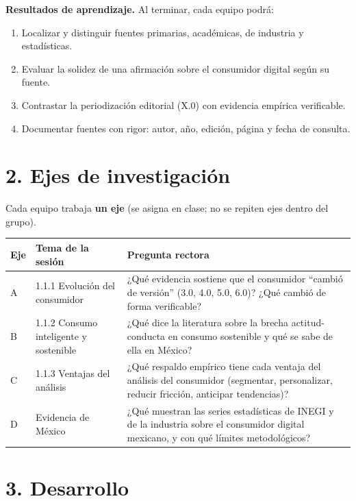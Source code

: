 \documentclass[11pt,letterpaper]{article}
\begin{document}
\begin{caja}
\textbf{Resultados de aprendizaje.} Al terminar, cada equipo podrá:
\begin{enumerate}[leftmargin=1.4em, itemsep=2pt]
  \item Localizar y distinguir fuentes primarias, académicas, de industria y estadísticas.
  \item Evaluar la solidez de una afirmación sobre el consumidor digital según su fuente.
  \item Contrastar la periodización editorial (X.0) con evidencia empírica verificable.
  \item Documentar fuentes con rigor: autor, año, edición, página y fecha de consulta.
\end{enumerate}
\end{caja}

\section*{2. Ejes de investigación}

Cada equipo trabaja \textbf{un eje} (se asigna en clase; no se repiten ejes dentro del grupo).

\begin{center}
\small
\begin{tabular}{@{}>{\raggedright}p{1.1cm}>{\raggedright}p{4.6cm}>{\raggedright\arraybackslash}p{8.4cm}@{}}
\toprule
\textbf{Eje} & \textbf{Tema de la sesión} & \textbf{Pregunta rectora} \\
\midrule
A & 1.1.1 Evolución del consumidor & ¿Qué evidencia sostiene que el consumidor \enquote{cambió de versión} (3.0, 4.0, 5.0, 6.0)? ¿Qué cambió de forma verificable? \\
B & 1.1.2 Consumo inteligente y sostenible & ¿Qué dice la literatura sobre la brecha actitud-conducta en consumo sostenible y qué se sabe de ella en México? \\
C & 1.1.3 Ventajas del análisis & ¿Qué respaldo empírico tiene cada ventaja del análisis del consumidor (segmentar, personalizar, reducir fricción, anticipar tendencias)? \\
D & Evidencia de México & ¿Qué muestran las series estadísticas de INEGI y de la industria sobre el consumidor digital mexicano, y con qué límites metodológicos? \\
\bottomrule
\end{tabular}
\end{center}

\section*{3. Desarrollo}
\end{document}
